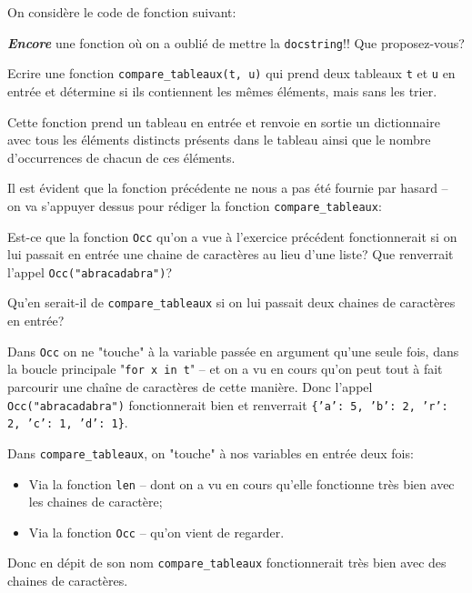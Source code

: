 \documentclass[12pt]{article}
\begin{document}
	\begin{MonExo}
		On considère le code de fonction suivant:
		\begin{alphenum}
			\item \textbf{\textit{Encore}} une fonction où on a oublié de mettre la \texttt{docstring}!! Que proposez-vous?
			\item Ecrire une fonction \texttt{compare\_tableaux(t, u)} qui prend deux tableaux \texttt{t} et \texttt{u} en entrée et détermine si ils contiennent les mêmes éléments, mais sans les trier.
		\end{alphenum}
	\end{MonExo}
	\begin{MaReponse}
		\begin{alphenum}
			\item Cette fonction prend un tableau en entrée et renvoie en sortie un dictionnaire avec tous les éléments distincts présents dans le tableau ainsi que le nombre d'occurrences de chacun de ces éléments.
			
			\item Il est évident que la fonction précédente ne nous a pas été fournie par hasard -- on va s'appuyer dessus pour rédiger la fonction \texttt{compare\_tableaux}:
		\end{alphenum}
	\end{MaReponse}
	
	\begin{MonExo}
		Est-ce que la fonction \texttt{Occ} qu'on a vue à l'exercice précédent fonctionnerait si on lui passait en entrée une chaine de caractères au lieu d'une liste? Que renverrait l'appel \texttt{Occ("abracadabra")}?
		
		Qu'en serait-il de \texttt{compare\_tableaux} si on lui passait deux chaines de caractères en entrée?
	\end{MonExo}
	\begin{MaReponse}
		Dans \texttt{Occ} on ne "touche" à la variable passée en argument qu'une seule fois, dans la boucle principale "\texttt{for x in t}" -- et on a vu en cours qu'on peut tout à fait parcourir une chaîne de caractères de cette manière. Donc l'appel \texttt{Occ("abracadabra")} fonctionnerait bien et renverrait \texttt{\{'a': 5, 'b': 2, 'r': 2, 'c': 1, 'd': 1\}}.
		
		Dans \texttt{compare\_tableaux}, on "touche" à nos variables en entrée deux fois:
		\begin{itemize}
			\item Via la fonction \texttt{len} -- dont on a vu en cours qu'elle fonctionne très bien avec les chaines de caractère;
			\item Via la fonction \texttt{Occ} -- qu'on vient de regarder.
		\end{itemize}
		Donc en dépit de son nom \texttt{compare\_tableaux} fonctionnerait très bien avec des chaines de caractères.
	\end{MaReponse}
	
\end{document}
